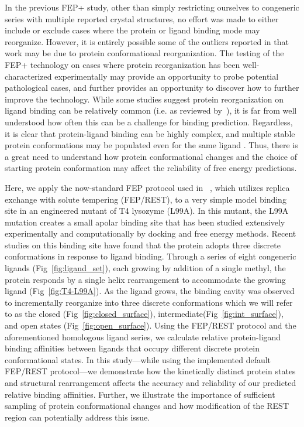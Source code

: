 \documentclass[journal=jctcce,manuscript=article]{achemso}
\begin{document}
In the previous FEP+ study\cite{FEPplus}, other than simply restricting ourselves to congeneric series with multiple reported crystal structures, no effort was made to either include or exclude cases where the protein or ligand binding mode may reorganize.  
However, it is entirely possible some of the outliers reported in that work may be due to protein conformational reorganization.
The testing of the FEP+ technology on cases where protein reorganization has been well-characterized experimentally may provide an opportunity to probe potential pathological cases, and further provides an opportunity to discover how to further improve the technology. While some studies suggest protein reorganization on ligand binding can be relatively common (i.e. as reviewed by~\cite{Mobley:2009bm}), it is far from well understood how often this can be a challenge for binding prediction.  
Regardless, it is clear that protein-ligand binding can be highly complex, and multiple stable protein conformations may be populated even for the same ligand \cite{doi:10.1021/jm060167o,Gutteridge200521,Merski2015}.
Thus, there is a great need to understand how protein conformational changes and the choice of starting protein conformation may affect the reliability of free energy predictions.  

Here, we apply the now-standard FEP protocol used in ~\cite{FEPplus}, which utilizes replica exchange with solute tempering (FEP/REST)\cite{FEP/REST}, to a very simple model binding site in an engineered mutant of T4 lysozyme (L99A).
In this mutant, the L99A mutation creates a small apolar binding site that has been studied extensively experimentally\cite{eriksson1992response,eriksson1993similar,T4affinity,doi:10.1021/bi00027a007} and computationally by docking\cite{wei2002model,wei2004testing,graves2005decoys,Merski2015} and free energy methods\cite{Mobley20071118,hermans1997inclusion,boresch2003absolute,deng2006calculation,mann2000modeling,Boyce2009,FEP/REST,FEP/RESTapp}.
Recent studies on this binding site have found that the protein adopts three discrete conformations in response to ligand binding\cite{Merski2015}.
Through a series of eight congeneric ligands (Fig~\ref{fig:ligand_set}), each growing by addition of a single methyl, the protein responds by a single helix rearrangement to accommodate the growing ligand (Fig~\ref{fig:T4-L99A}).
As the ligand grows, the binding cavity was observed to incrementally reorganize into three discrete conformations which we will refer to as the closed (Fig~\ref{fig:closed_surface}), intermediate(Fig~\ref{fig:int_surface}), and open states (Fig~\ref{fig:open_surface}).
Using the FEP/REST protocol and the aforementioned homologous ligand series, we calculate relative protein-ligand binding affinities between ligands that occupy different discrete protein conformational states.
In this study---while using the implemented default FEP/REST protocol---we demonstrate how the kinetically distinct protein states and structural rearrangement affects the accuracy and reliability of our predicted relative binding affinities.
Further, we illustrate the importance of sufficient sampling of protein conformational changes and how modification of the REST region can potentially address this issue.
\end{document}
